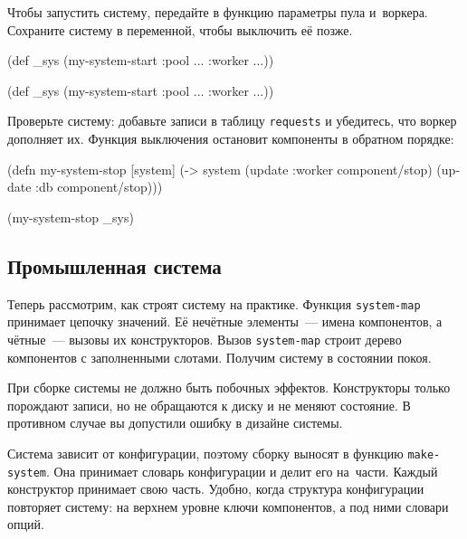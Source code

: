 Чтобы запустить систему, передайте в функцию параметры пула и~воркера. Сохраните
систему в переменной, чтобы выключить её позже.

\ifx\DEVICETYPE\MOBILE

\begin{english}
  \begin{clojure}
(def _sys
  (my-system-start
    {:pool {...} :worker {...}}))
  \end{clojure}
\end{english}

\else

\begin{english}
  \begin{clojure}
(def _sys (my-system-start {:pool {...} :worker {...}}))
  \end{clojure}
\end{english}

\fi

Проверьте систему: добавьте записи в таблицу \verb|requests| и убедитесь, что
воркер дополняет их. Функция выключения остановит компоненты в обратном порядке:

\begin{english}
  \begin{clojure}
(defn my-system-stop
  [system]
  (-> system
      (update :worker component/stop)
      (update :db component/stop)))

(my-system-stop _sys)
  \end{clojure}
\end{english}

\subsection{Промышленная система}


Теперь рассмотрим, как строят систему на практике. Функция \verb|system-map|
принимает цепочку значений. Её нечётные элементы~--- имена компонентов, а
чётные~--- вызовы их конструкторов. Вызов \verb|system-map| строит дерево
компонентов с заполненными слотами. Получим систему в состоянии покоя.


При сборке системы не должно быть побочных эффектов. Конструкторы только
порождают записи, но не обращаются к диску и не меняют состояние. В противном
случае вы допустили ошибку в дизайне системы.

Система зависит от конфигурации, поэтому сборку выносят в функцию
\verb|make-system|. Она принимает словарь конфигурации и делит его
на~части. Каждый конструктор принимает свою часть. Удобно, когда структура
конфигурации повторяет систему: на верхнем уровне ключи компонентов, а под ними
словари опций.


